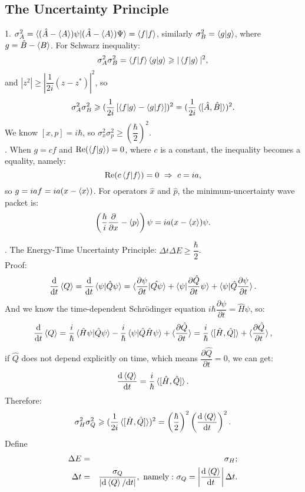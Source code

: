 \documentclass[12pt, 
]{article}
\begin{document}
\subsection{The Uncertainty Principle}\label{subsec:3.5}
1. $\sigma_A^2=\braket{(\hat{A}-\braket{A})\psi|(\hat{A}-\braket{A})\Psi}=\braket{f|f}$, similarly $\sigma_B^2=\braket{g|g}$, where $g=\hat{B}-\braket{B}$. For Schwarz inequality:
\[
	\sigma_A^2\sigma_B^2=\braket{f|f}\braket{g|g}\geqslant|\braket{f|g}|^2,
\]
and $|z^2|\geqslant\left|\dfrac{1}{2i}(z-z^*)\right|^2$, so
\[
	\sigma^2_A\sigma^2_B\geqslant(\frac{1}{2i}\left[\braket{f|g}-\braket{g|f}\right])^2=(\frac{1}{2i}\braket{[\hat{A},\hat{B}]})^2.
\]
We know $[x,p]=i\hbar$, so $\sigma_x^2\sigma_p^2\geqslant\left(\dfrac{\hbar}{2}\right)^2$.
~\\

. When $g=cf$ and ${\rm Re}(\braket{f|g})=0$, where $c$ is a constant, the inequality becomes a equality, namely:
\[
	{\rm Re}(c\braket{f|f})=0~\Rightarrow~c=ia 
,\]
so $g=iaf=ia(x-\braket{x})$. For operators $\hat{x}$ and $\hat{p}$, the minimum-uncertainty wave packet is: $$\left(\frac{\hbar}{i}\frac{\partial}{\partial x}-\braket{p}\right)\psi=ia(x-\braket{x})\psi.$$

. The Energy-Time Uncertainty Principle: $\Delta t\Delta E\geqslant \dfrac{\hbar}{2}$.\\
Proof: \[
	\frac{{\rm d}}{{\rm d}t}\braket{Q}=\frac{{\rm d}}{{\rm d}t}\braket{\psi|\hat{Q}\psi}=\braket{\frac{\partial\psi}{\partial t}|\hat{Q\psi}}+\braket{\psi|\frac{\partial\hat{Q}}{\partial t}\psi}+\braket{\psi|\hat{Q}\frac{\partial\psi}{\partial t}}.
\]
And we know the time-dependent Schr\"odinger equation $i\hbar \dfrac{\partial \psi}{\partial t}=\hat{H}\psi$, so:
\[
	\frac{{\rm d}}{{\rm d}t}\braket{Q}=\frac{i}{\hbar}\braket{\hat{H}\psi|\hat{Q}\psi}-\frac{i}{\hbar}\braket{\psi|\hat{Q}\hat{H}\psi}+\braket{\frac{\partial\hat{Q}}{\partial t}}=\frac{i}{\hbar}\braket{[\hat{H},\hat{Q}]}+\braket{\frac{\partial\hat{Q}}{\partial t}}
,\]
if $\hat{Q}$ does not depend explicitly on time, which means $\dfrac{{\partial}\hat{Q}}{\partial t}=0$, we can get:
\begin{equation}\label{eq:15}
	\frac{{\rm d}\braket{Q}}{{\rm d} t}=\frac{i}{\hbar}\braket{[\hat{H},\hat{Q}]}.
\end{equation}
Therefore:
\[
	\sigma_H^2\sigma_Q^2\geqslant(\frac{1}{2i}\braket{[\hat{H},\hat{Q}]})^2=\left(\frac{\hbar}{2}\right)^2\left(\frac{{\rm d}\braket{Q}}{{\rm d} t}\right)^2.
\]
Define
\begin{eqnarray*}
	\Delta E&=&\sigma_H;\\
	\Delta t&=&\frac{\sigma_Q}{|{\rm d}\braket{Q}/{\rm d}t|}, ~{\rm namely:}~\sigma_Q=\left|\frac{{\rm d}\braket{Q}}{{\rm d}t}\right|\Delta t.
\end{eqnarray*}
~\\
\end{document}
